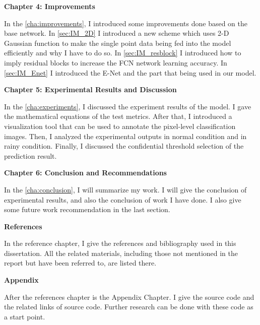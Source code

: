 \begin{spacing}{1.5}
{\large\textbf{Chapter 4: Improvements}}

In the \autoref{cha:improvements}, I introduced some improvements done based on the base network. In \autoref{sec:IM_2D} I introduced a new scheme which uses 2-D Gaussian function to make the single point data being fed into the model efficiently and why I have to do so. In \autoref{sec:IM_resblock} I  introduced how to imply residual blocks to increase the FCN network learning accuracy. In \autoref{sec:IM_Enet} I introduced the E-Net and the part that being used in our model.

{\large\textbf{Chapter 5: Experimental Results and Discussion}}

In the \autoref{cha:experiments}, I discussed the experiment results of the model. I gave the mathematical equations of the test metrics. After that, I introduced a visualization tool that can be used to annotate the pixel-level classification images. Then, I analyzed the experimental outputs in normal condition and in rainy condition. Finally, I discussed the confidential threshold selection of the prediction result.

{\large\textbf{Chapter 6: Conclusion and Recommendations}}

In the \autoref{cha:conclusion}, I will summarize my work. I will give the conclusion of experimental results, and also the conclusion of work I have done. I also give some future work recommendation in the last section.

{\large\textbf{References}}

In the reference chapter, I give the references and bibliography used in this dissertation. All the related materials, including those not mentioned in the report but have been referred to, are listed there.

{\large\textbf{Appendix}}

After the references chapter is the Appendix Chapter. I give the source code and the related links of source code. Further research can be done with these code as a start point.

\end{spacing}
\newpage



